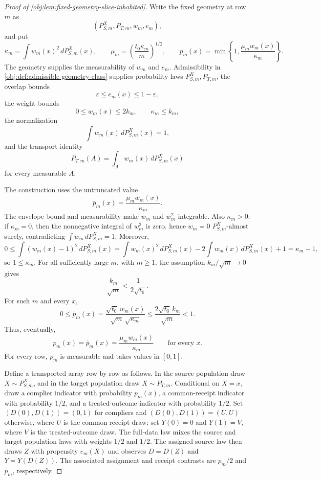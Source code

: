 \begin{proof}[Proof of \cref{obj:lem:fixed-geometry-slice-inhabited}]
Write the fixed geometry at row \(m\) as
\[
(P_{S,m}^X,P_{T,m},w_m,e_m),
\]
and put
\[
\kappa_m=\int w_m(x)^2\,dP_{S,m}^X(x),
\qquad
\mu_m=\left(\frac{t_0\kappa_m}{m}\right)^{1/2},
\qquad
p_m(x)=\min\left\{1,\frac{\mu_m w_m(x)}{\kappa_m}\right\}.
\]
The geometry supplies the measurability of \(w_m\) and \(e_m\). Admissibility in \cref{obj:def:admissible-geometry-class} supplies probability laws \(P_{S,m}^X,P_{T,m}\), the overlap bounds
\[
\varepsilon\le e_m(x)\le1-\varepsilon,
\]
the weight bounds
\[
0\le w_m(x)\le2k_m,
\qquad
\kappa_m\le k_m,
\]
the normalization
\[
\int w_m(x)\,dP_{S,m}^X(x)=1,
\]
and the transport identity
\[
P_{T,m}(A)=\int_A w_m(x)\,dP_{S,m}^X(x)
\]
for every measurable \(A\). %

The construction uses the untruncated value
\[
\bar p_m(x)=\frac{\mu_m w_m(x)}{\kappa_m}.
\]
The envelope bound and measurability make \(w_m\) and \(w_m^2\) integrable. Also \(\kappa_m>0\): if \(\kappa_m=0\), then the nonnegative integral of \(w_m^2\) is zero, hence \(w_m=0\) \(P_{S,m}^X\)-almost surely, contradicting \(\int w_m\,dP_{S,m}^X=1\). Moreover,
\[
0\le \int (w_m(x)-1)^2\,dP_{S,m}^X(x)
=\int w_m(x)^2\,dP_{S,m}^X(x)-2\int w_m(x)\,dP_{S,m}^X(x)+1
=\kappa_m-1,
\]
so \(1\le\kappa_m\). For all sufficiently large \(m\), with \(m\ge1\), the assumption \(k_m/\sqrt m\to0\) gives
\[
\frac{k_m}{\sqrt m}<\frac{1}{2\sqrt{t_0}}.
\]
For such \(m\) and every \(x\),
\[
0\le \bar p_m(x)
=\frac{\sqrt{t_0}\,w_m(x)}{\sqrt m\,\sqrt{\kappa_m}}
\le
\frac{2\sqrt{t_0}\,k_m}{\sqrt m}
<1.
\]
Thus, eventually,
\[
p_m(x)=\bar p_m(x)=\frac{\mu_m w_m(x)}{\kappa_m}
\qquad\text{for every }x.
\]
For every row, \(p_m\) is measurable and takes values in \([0,1]\). %

Define a transported array row by row as follows. In the source population draw \(X\sim P_{S,m}^X\), and in the target population draw \(X\sim P_{T,m}\). Conditional on \(X=x\), draw a complier indicator with probability \(p_m(x)\), a common-receipt indicator with probability \(1/2\), and a treated-outcome indicator with probability \(1/2\). Set \((D(0),D(1))=(0,1)\) for compliers and \((D(0),D(1))=(U,U)\) otherwise, where \(U\) is the common-receipt draw; set \(Y(0)=0\) and \(Y(1)=V\), where \(V\) is the treated-outcome draw. The full-data law mixes the source and target population laws with weights \(1/2\) and \(1/2\). The assigned source law then draws \(Z\) with propensity \(e_m(X)\) and observes \(D=D(Z)\) and \(Y=Y(D(Z))\). The associated assignment and receipt contrasts are \(p_m/2\) and \(p_m\), respectively.


\end{proof}
